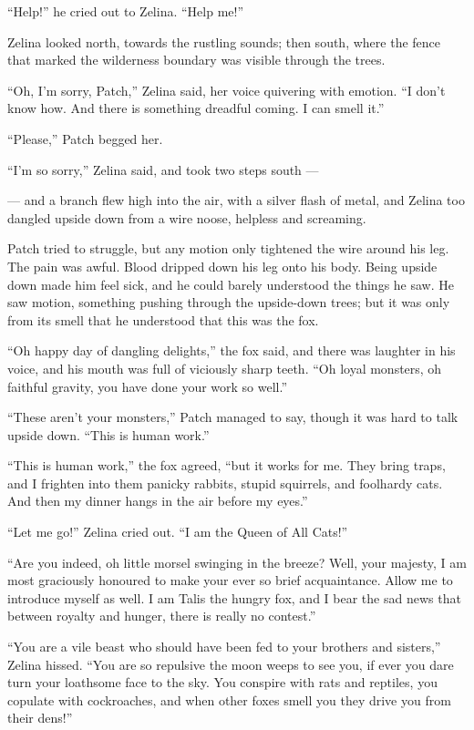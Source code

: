 \documentclass[ebook,oneside,openany,17pt]{memoir}
\newenvironment{tolerant}[1]{%
  \par\tolerance=#1\relax
}{%
  \par
}
\begin{document}
“Help!” he cried out to Zelina. “Help me!”

Zelina looked north, towards the rustling sounds; then south, where
the fence that marked the wilderness boundary was visible through the
trees.

“Oh, I’m sorry, Patch,” Zelina said, her voice quivering with
emotion. “I don’t know how. And there is something dreadful coming. I
can smell it.”

“Please,” Patch begged her.

“I’m so sorry,” Zelina said, and took two steps south —

— and a branch flew high into the air, with a silver flash of metal,
and Zelina too dangled upside down from a wire noose, helpless and
screaming.

Patch tried to struggle, but any motion only tightened the wire around
his leg. The pain was awful. Blood dripped down his leg onto his
body. Being upside down made him feel sick, and he could barely
understood the things he saw. He saw motion, something pushing through
the upside-down trees; but it was only from its smell that he
understood that this was the fox.

“Oh happy day of dangling delights,” the fox said, and there was
laughter in his voice, and his mouth was full of viciously sharp
teeth. “Oh loyal monsters, oh faithful gravity, you have done your
work so well.”

“These aren’t your monsters,” Patch managed to say, though it was hard
to talk upside down. “This is human work.”

\begin{tolerant}{1000}
“This is human work,” the fox agreed, “but it works for me. They bring
traps, and I frighten into them panicky rabbits, stupid squirrels, and
foolhardy cats. And then my dinner hangs in the air before my eyes.”
\end{tolerant}

“Let me go!” Zelina cried out. “I am the Queen of All Cats!”

“Are you indeed, oh little morsel swinging in the breeze? Well, your
majesty, I am most graciously honoured to make your ever so brief
acquaintance. Allow me to introduce myself as well. I am Talis the
hungry fox, and I bear the sad news that between royalty and hunger,
there is really no contest.”

“You are a vile beast who should have been fed to your brothers and
sisters,” Zelina hissed. “You are so repulsive the moon weeps to see
you, if ever you dare turn your loathsome face to the sky. You
conspire with rats and reptiles, you copulate with cockroaches, and
when other foxes smell you they drive you from their dens!”
\end{document}
